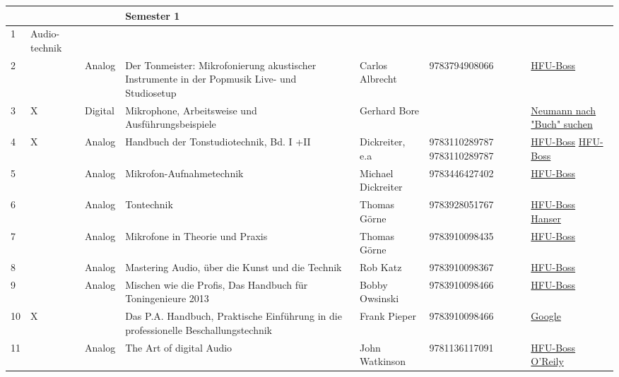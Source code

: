 \begin{longtable}{|p{}|p{}|p{}|p{}|p{}|p{}|p{}|}
\rowcolor{YellowGreen!30}  & &  & Semester 1 &  &  &  \\
\hline
\rowcolor{gray!30}1 & Audio- technik &  &  &  &  &  \\
\hline
2 &  & Analog & Der Tonmeister: Mikrofonierung akustischer Instrumente in der Popmusik Live- und Studiosetup & Carlos Albrecht & 9783794908066 & \href{https://hsfu.boss.bsz-bw.de/Record/(DE-627)1390819469?sid=14400414}{HFU-Boss} \\
\hline
3 & X & Digital & Mikrophone, Arbeitsweise und Ausführungsbeispiele & Gerhard Bore &  & \href{https://www.neumann.com/de-de/downloads/}{Neumann nach "Buch" suchen}  \\
\hline
4 & X & Analog & Handbuch der Tonstudiotechnik, Bd. I +II & Dickreiter, e.a & 9783110289787 9783110289787 & \href{https://hsfu.boss.bsz-bw.de/Record/(DE-627)1371764190?sid=14400565}{HFU-Boss} \href{https://hsfu.boss.bsz-bw.de/Record/(DE-627)1371764735?sid=14400565}{HFU-Boss} \\
\hline
5 &  &  Analog & Mikrofon-Aufnahmetechnik & Michael Dickreiter & 9783446427402 & \href{https://hsfu.boss.bsz-bw.de/Record/(DE-627)364585684?sid=15210374}{HFU-Boss} \\
\hline
6 &  & Analog & Tontechnik & Thomas Görne & 9783928051767 & \href{https://hsfu.boss.bsz-bw.de/Record/(DE-627)662839374?sid=14441611}{HFU-Boss}  \href{https://www.hanser-elibrary.com/doi/epdf/10.3139/9783446427402}{Hanser} \\
\hline
7 &  & Analog & Mikrofone in Theorie und Praxis & Thomas Görne & 9783910098435 & \href{https://hsfu.boss.bsz-bw.de/Record/(DE-627)180379496?sid=15232489}{HFU-Boss} \\
\hline
8 &  & Analog & Mastering Audio, über die Kunst und die Technik & Rob Katz & 9783910098367 & \href{https://hsfu.boss.bsz-bw.de/Record/(DE-627)1606379518?sid=15232491}{HFU-Boss} \\
\hline
9 &  & Analog & Mischen wie die Profis, Das Handbuch für Toningenieure 2013 & Bobby Owsinski & 9783910098466 & \href{https://hsfu.boss.bsz-bw.de/Record/(DE-627)529150093?sid=15232517}{HFU-Boss} \\
\hline
10 & X &  & Das P.A. Handbuch, Praktische Einführung in die professionelle Beschallungstechnik & Frank Pieper & 9783910098466 & \href{https://g.co/kgs/aJoSraA}{Google} \\
\hline
11 &  & Analog & The Art of digital Audio & John Watkinson & 9781136117091 & \href{https://hsfu.boss.bsz-bw.de/Record/(DE-627)168052982X?sid=15232558}{HFU-Boss} \href{https://learning.oreilly.com/library/view/art-of-digital/9780240515878/?ar=}{O'Reily}\\

\end{longtable}
